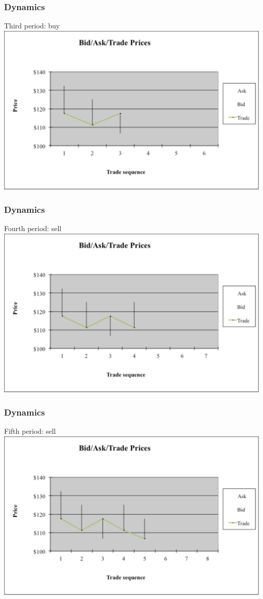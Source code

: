\begin{frame} [noframenumbering]
	\frametitle{Dynamics}
	Third period: buy
	\center
	\includegraphics[width=0.9\linewidth]{pics/P3_Image.pdf}
\end{frame}


\begin{frame} [noframenumbering]
	\frametitle{Dynamics}
	Fourth period: sell
	\center
	\includegraphics[width=0.9\linewidth]{pics/P4_Image.pdf}
\end{frame}


\begin{frame} [noframenumbering]
	\frametitle{Dynamics}
	Fifth period: sell
	\center
	\includegraphics[width=0.9\linewidth]{pics/P5_Image.pdf}
\end{frame}



